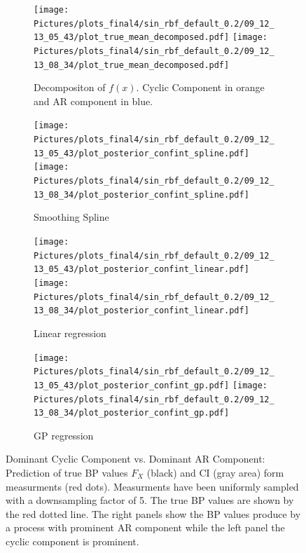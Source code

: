 \begin{figure}
\begin{subfigure}{\textwidth}
    \centering
    \texttt{[image: 
        Pictures/plots\_final4/sin\_rbf\_default\_0.2/09\_12\_13\_05\_43/plot\_true\_mean\_decomposed.pdf]}
    \texttt{[image: 
        Pictures/plots\_final4/sin\_rbf\_default\_0.2/09\_12\_13\_08\_34/plot\_true\_mean\_decomposed.pdf]}
  \caption{Decompositon of $f(x)$. Cyclic Component in orange and AR component in blue.}
\end{subfigure}

\begin{subfigure}{\textwidth}
    \centering
    \texttt{[image: 
        Pictures/plots\_final4/sin\_rbf\_default\_0.2/09\_12\_13\_05\_43/plot\_posterior\_confint\_spline.pdf]}
    \texttt{[image: 
        Pictures/plots\_final4/sin\_rbf\_default\_0.2/09\_12\_13\_08\_34/plot\_posterior\_confint\_spline.pdf]}
  \caption{Smoothing Spline}
\end{subfigure}

\begin{subfigure}{\textwidth}
    \centering
    \texttt{[image: 
        Pictures/plots\_final4/sin\_rbf\_default\_0.2/09\_12\_13\_05\_43/plot\_posterior\_confint\_linear.pdf]}
    \texttt{[image: 
        Pictures/plots\_final4/sin\_rbf\_default\_0.2/09\_12\_13\_08\_34/plot\_posterior\_confint\_linear.pdf]}
  \caption{Linear regression }
\end{subfigure}

\begin{subfigure}{\textwidth}
    \centering
    \texttt{[image: 
        Pictures/plots\_final4/sin\_rbf\_default\_0.2/09\_12\_13\_05\_43/plot\_posterior\_confint\_gp.pdf]}
    \texttt{[image: 
        Pictures/plots\_final4/sin\_rbf\_default\_0.2/09\_12\_13\_08\_34/plot\_posterior\_confint\_gp.pdf]}
  \caption{GP regression}
\end{subfigure}\hfill

\caption[Dominant Cyclic Component vs. Dominant AR Component]{Dominant Cyclic Component vs. Dominant AR Component:
    Prediction of true BP values $F_X$ (black)
    and CI (gray area) form measurments (red dots). Measurments
    have been uniformly sampled with a downsampling factor of 5.
    The true BP values are shown by the red dotted line.
    The right  panels show the BP values produce by a process with prominent AR component
    while the left panel the cyclic component is prominent.
 }
\label{fig:ex-ar-cyclic}
\end{figure}

